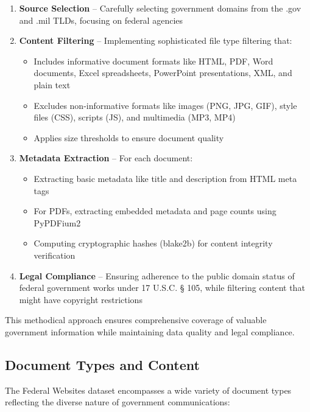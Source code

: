 \begin{enumerate}
    \item \textbf{Source Selection} -- Carefully selecting government domains from the .gov and .mil TLDs, focusing on federal agencies
    
    \item \textbf{Content Filtering} -- Implementing sophisticated file type filtering that:
    \begin{itemize}
        \item Includes informative document formats like HTML, PDF, Word documents, Excel spreadsheets, PowerPoint presentations, XML, and plain text
        \item Excludes non-informative formats like images (PNG, JPG, GIF), style files (CSS), scripts (JS), and multimedia (MP3, MP4)
        \item Applies size thresholds to ensure document quality
    \end{itemize}
    
    \item \textbf{Metadata Extraction} -- For each document:
    \begin{itemize}
        \item Extracting basic metadata like title and description from HTML meta tags
        \item For PDFs, extracting embedded metadata and page counts using PyPDFium2
        \item Computing cryptographic hashes (blake2b) for content integrity verification
    \end{itemize}
    
    \item \textbf{Legal Compliance} -- Ensuring adherence to the public domain status of federal government works under 17 U.S.C. § 105, while filtering content that might have copyright restrictions
\end{enumerate}

This methodical approach ensures comprehensive coverage of valuable government information while maintaining data quality and legal compliance.

\subsection{Document Types and Content}

The Federal Websites dataset encompasses a wide variety of document types reflecting the diverse nature of government communications:

